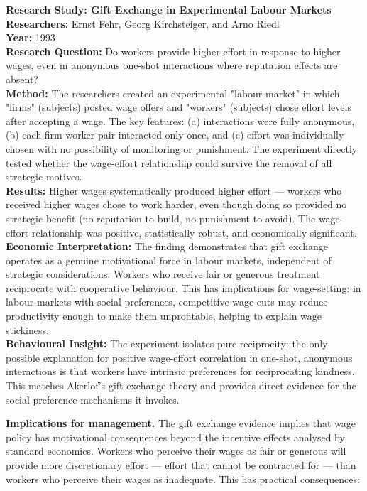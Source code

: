 \documentclass[12pt, letterpaper]{article}
\begin{document}
\begin{researchbox}
\textbf{Research Study: Gift Exchange in Experimental Labour Markets}\\[4pt]

\textbf{Researchers:} Ernst Fehr, Georg Kirchsteiger, and Arno Riedl\\[4pt]
\textbf{Year:} 1993\\[4pt]
\textbf{Research Question:} Do workers provide higher effort in response to higher wages, even in anonymous one-shot interactions where reputation effects are absent?\\[4pt]
\textbf{Method:} The researchers created an experimental "labour market" in which "firms" (subjects) posted wage offers and "workers" (subjects) chose effort levels after accepting a wage. The key features: (a) interactions were fully anonymous, (b) each firm-worker pair interacted only once, and (c) effort was individually chosen with no possibility of monitoring or punishment. The experiment directly tested whether the wage-effort relationship could survive the removal of all strategic motives.\\[4pt]
\textbf{Results:} Higher wages systematically produced higher effort --- workers who received higher wages chose to work harder, even though doing so provided no strategic benefit (no reputation to build, no punishment to avoid). The wage-effort relationship was positive, statistically robust, and economically significant.\\[4pt]
\textbf{Economic Interpretation:} The finding demonstrates that gift exchange operates as a genuine motivational force in labour markets, independent of strategic considerations. Workers who receive fair or generous treatment reciprocate with cooperative behaviour. This has implications for wage-setting: in labour markets with social preferences, competitive wage cuts may reduce productivity enough to make them unprofitable, helping to explain wage stickiness.\\[4pt]
\textbf{Behavioural Insight:} The experiment isolates pure reciprocity: the only possible explanation for positive wage-effort correlation in one-shot, anonymous interactions is that workers have intrinsic preferences for reciprocating kindness. This matches Akerlof's gift exchange theory and provides direct evidence for the social preference mechanisms it invokes.\\[4pt]
\end{researchbox}

\textbf{Implications for management.} The gift exchange evidence implies that wage policy has motivational consequences beyond the incentive effects analysed by standard economics. Workers who perceive their wages as fair or generous will provide more discretionary effort --- effort that cannot be contracted for --- than workers who perceive their wages as inadequate. This has practical consequences:
\end{document}
